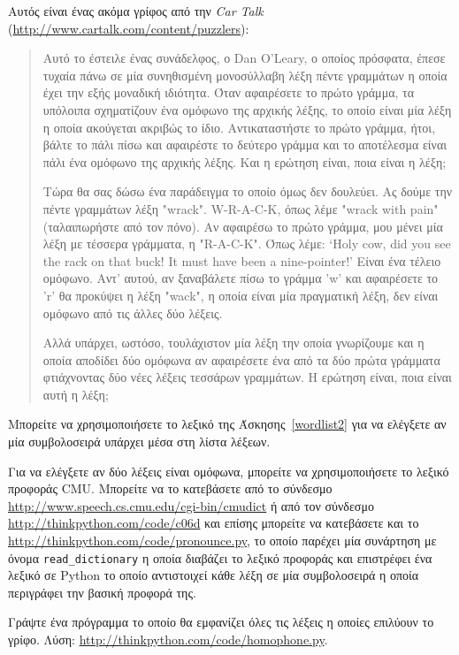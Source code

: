 \documentclass[10pt]{book}
\begin{document}
\begin{exercise}

Αυτός είναι ένας ακόμα γρίφος από την   {\em Car
Talk} (\url{http://www.cartalk.com/content/puzzlers}):

\begin{quote}
 Αυτό το έστειλε ένας συνάδελφος, ο Dan O'Leary, ο οποίος πρόσφατα, έπεσε τυχαία πάνω σε μία συνηθισμένη μονοσύλλαβη λέξη πέντε γραμμάτων η οποία έχει την εξής μοναδική ιδιότητα. Όταν αφαιρέσετε το πρώτο γράμμα, τα υπόλοιπα σχηματίζουν ένα ομόφωνο της αρχικής λέξης, το οποίο είναι μία λέξη η οποία ακούγεται ακριβώς το ίδιο. Αντικαταστήστε το πρώτο γράμμα, ήτοι, βάλτε το πάλι πίσω και αφαιρέστε το δεύτερο γράμμα και το αποτέλεσμα είναι πάλι ένα ομόφωνο της αρχικής λέξης. Και η ερώτηση είναι, ποια είναι η λέξη; 

 Τώρα θα σας δώσω ένα παράδειγμα το οποίο όμως δεν δουλεύει. Ας δούμε την πέντε γραμμάτων λέξη "wrack". W-R-A-C-K, όπως λέμε "wrack with pain" (ταλαιπωρήστε από τον πόνο). Αν αφαιρέσω το πρώτο γράμμα, μου μένει μία λέξη με τέσσερα γράμματα, η "R-A-C-K". Όπως λέμε: `Holy cow, did you see the rack on that buck! It must have been a nine-pointer!' Είναι ένα τέλειο ομόφωνο. Αντ' αυτού, αν ξαναβάλετε πίσω το γράμμα 'w' και αφαιρέσετε το 'r' θα προκύψει η λέξη  "wack",  η οποία είναι μία πραγματική λέξη, δεν είναι ομόφωνο από τις άλλες δύο λέξεις. 

Αλλά υπάρχει, ωστόσο, τουλάχιστον μία λέξη την οποία γνωρίζουμε και η οποία αποδίδει δύο ομόφωνα αν αφαιρέσετε ένα από τα δύο πρώτα γράμματα φτιάχνοντας δύο νέες λέξεις τεσσάρων γραμμάτων. Η ερώτηση είναι, ποια είναι αυτή η λέξη;
\end{quote}

 Μπορείτε να χρησιμοποιήσετε το λεξικό της Άσκησης~\ref{wordlist2} για να ελέγξετε αν μία συμβολοσειρά υπάρχει μέσα στη λίστα λέξεων.

Για να ελέγξετε αν δύο λέξεις είναι ομόφωνα, μπορείτε να χρησιμοποιήσετε το λεξικό προφοράς CMU. Μπορείτε να το κατεβάσετε από το σύνδεσμο \url{http://www.speech.cs.cmu.edu/cgi-bin/cmudict} ή από τον σύνδεσμο \url{http://thinkpython.com/code/c06d} και επίσης μπορείτε να κατεβάσετε και το \url{http://thinkpython.com/code/pronounce.py}, το οποίο παρέχει μία συνάρτηση με όνομα \verb"read_dictionary" η οποία διαβάζει το λεξικό προφοράς και επιστρέφει ένα λεξικό σε Python το οποίο αντιστοιχεί κάθε λέξη σε μία συμβολοσειρά η οποία περιγράφει την βασική προφορά της.

Γράψτε ένα πρόγραμμα το οποίο θα εμφανίζει όλες τις λέξεις η οποίες επιλύουν το γρίφο. Λύση: \url{http://thinkpython.com/code/homophone.py}.

\end{exercise}
\end{document}
